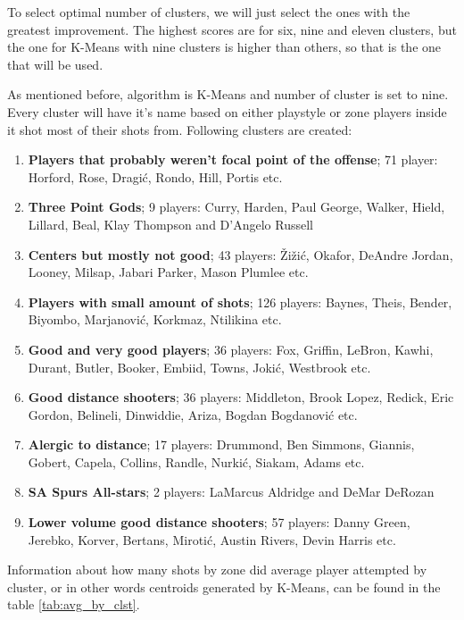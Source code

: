 \documentclass[a4paper]{article}
\begin{document}
To select optimal number of clusters, we will just select the ones with the greatest improvement. The highest scores are for six, nine and eleven clusters, but the one for K-Means with nine clusters is higher than others, so that is the one that will be used.

As mentioned before, algorithm is K-Means and number of cluster is set to nine. Every cluster will have it's name based on either playstyle or zone players inside it shot most of their shots from. Following clusters are created:

\begin{enumerate}
	\item \textbf{Players that probably weren't focal point of the offense}; 71 player: Horford, Rose, Dragić, Rondo, Hill, Portis etc.
	\item \textbf{Three Point Gods}; 9 players: Curry, Harden, Paul George, Walker, Hield, Lillard, Beal, Klay Thompson and D'Angelo Russell
	\item \textbf{Centers but mostly not good}; 43 players: Žižić, Okafor, DeAndre Jordan, Looney, Milsap, Jabari Parker, Mason Plumlee etc.
	\item \textbf{Players with small amount of shots}; 126 players: Baynes, Theis, Bender, Biyombo, Marjanović, Korkmaz, Ntilikina etc.
	\item \textbf{Good and very good players}; 36 players: Fox, Griffin, LeBron, Kawhi, Durant, Butler, Booker, Embiid, Towns, Jokić, Westbrook etc.
	\item \textbf{Good distance shooters}; 36 players: Middleton, Brook Lopez, Redick, Eric Gordon, Belineli, Dinwiddie, Ariza, Bogdan Bogdanović etc.
	\item \textbf{Alergic to distance}; 17 players: Drummond, Ben Simmons, Giannis, Gobert, Capela, Collins, Randle, Nurkić, Siakam, Adams etc.
	\item \textbf{SA Spurs All-stars}; 2 players: LaMarcus Aldridge and DeMar DeRozan
	\item \textbf{Lower volume good distance shooters}; 57 players: Danny Green, Jerebko, Korver, Bertans, Mirotić, Austin Rivers, Devin Harris etc.
\end{enumerate}

Information about how many shots by zone did average player attempted by cluster, or in other words centroids generated by K-Means, can be found in the table \ref{tab:avg_by_clst}.
\end{document}
